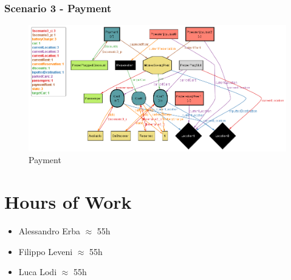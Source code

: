 \documentclass[english]{article}
\begin{document}
		\subsubsection{Scenario 3 - Payment}
			\begin{figure}[H]
				\centering
				\includegraphics[scale=0.8]{Scenario3_OK.png}%
				\caption{Payment}
			\end{figure}


\section{Hours of Work}
	\begin{itemize}
		\item Alessandro Erba $\approx$ 55h
		\item Filippo Leveni 	$\approx$ 55h
		\item Luca Lodi $\approx$ 55h
	\end{itemize}
\end{document}
